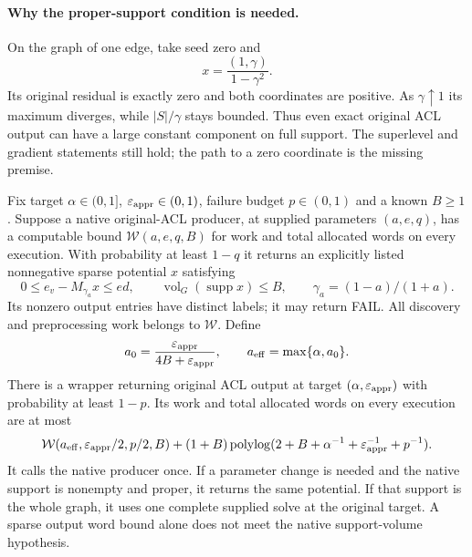 \paragraph{Why the proper-support condition is needed.}
On the graph of one edge, take seed zero and
\[
 x=\frac{(1,\gamma)}{1-\gamma^2}.
\]
Its original residual is exactly zero and both coordinates are positive.
As $\gamma\uparrow1$ its maximum diverges, while $|S|/\gamma$ stays
bounded. Thus even exact original ACL output can have a large constant
component on full support. The superlevel and gradient statements still
hold; the path to a zero coordinate is the missing premise.

\begin{theorem}
\label{thm:op3-small-alpha-floor}
Fix target $\alpha\in(0,1]$, $\varepsilon_{\mathrm{appr}}\in(0,1)$, failure budget
$p\in(0,1)$ and a known $B\geq1$.
Suppose a native original-ACL producer, at supplied parameters $(a,e,q)$,
has a computable bound $\mathcal W(a,e,q,B)$ for work and total allocated
words on every execution. With probability at least $1-q$ it returns
an explicitly listed nonnegative sparse potential $x$ satisfying
\[
 0\leq e_v-M_{\gamma_a}x\leq e d,\qquad
 \operatorname{vol}_G(\operatorname{supp}x)\leq B,
 \qquad \gamma_a=(1-a)/(1+a).
\]
Its nonzero output entries have distinct labels; it may return
\textnormal{FAIL}. All discovery and preprocessing work belongs to
$\mathcal W$. Define
\[
 a_0=\frac{\varepsilon_{\mathrm{appr}}}{4B+\varepsilon_{\mathrm{appr}}},\qquad
 a_{\mathrm{eff}}=\max\{\alpha,a_0\}.
\]
There is a wrapper returning original ACL output at target
$(\alpha,\varepsilon_{\mathrm{appr}})$ with probability at least $1-p$. Its work and
total allocated words on every execution are at most
\[
 \mathcal W(a_{\mathrm{eff}},\varepsilon_{\mathrm{appr}}/2,p/2,B)
 +(1+B)\operatorname{polylog}
 (2+B+\alpha^{-1}+\varepsilon_{\mathrm{appr}}^{-1}+p^{-1}).
\]
It calls the native producer once. If a parameter change is needed and
the native support is nonempty and proper, it returns the same potential.
If that support is the whole graph, it uses one complete supplied solve
at the original target. A sparse output word bound alone does not meet
the native support-volume hypothesis.
\end{theorem}
